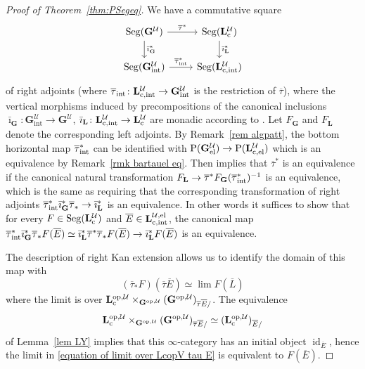 \documentclass{amsart}
\numberwithin{theorem}{subsection}
\theoremstyle{definition}
\providecommand{\op}{\mathrm{op}}
\providecommand{\xel}{\mathrm{el}}
\providecommand{\xint}{\mathrm{int}}
\newcommand{\xU}{\mathcal{U}}
\newcommand{\id}{\operatorname{id}}
\newcommand{\Pre}{\name{P}}
\newcommand{\name}[1]{\ensuremath{\text{\textup{#1}}}}
\newcommand{\levelg}{\mathbf{L}}
\newcommand{\levelgconn}{\levelg_{\name{c}}}
\newcommand{\levelcUint}{\levelg_{\name{c},\name{int}}^{\xU}}
\newcommand{\levelcUel}{\levelg_{\name{c},\name{el}}^{\xU}}
\newcommand{\levelcU}{\levelgconn^{\xU}}
\newcommand{\oplevelcU}{\levelg^{\op,\xU}_{\name{c}}}
\newcommand{\bbY}{\mathbf{G}}
\newcommand{\bbYU}{\bbY^\xU}
\newcommand{\bbYUint}{\bbY_{\xint}^{\xU}}
\newcommand{\bbYUel}{\bbY_{\xel}^{\xU}}
\newcommand{\opbbYU}{\bbY^{\op,\xU}}
\newcommand{\bartau}{\overline{\tau}}
\newcommand{\bartauint}{\bartau_{\name{int}}}
\newcommand{\Seg}{\name{Seg}}
\begin{document}
\begin{proof}[Proof of Theorem~\ref{thm:PSegeq}]
We have a commutative square 
\[
\begin{tikzcd}
\Seg(\bbYU) \arrow{d}{\bar \imath^*_{\bbY}} \arrow{r}{\bartau^*} & \Seg(\levelcU) \arrow{d}{\bar\imath_{\levelg}^*} \\
\Seg(\bbYUint) \arrow{r}{\bartauint^*}  & \Seg(\levelcUint) 
\end{tikzcd}
\]
of right adjoints (where $\bartauint \colon  \levelcUint \to \bbYUint$ is the restriction of $\bartau$), where the vertical morphisms induced by precompositions of the canonical inclusions $\bar\imath_{\bbY}\colon \bbYUint \to \bbYU$, $\bar\imath_{\levelg}\colon \levelcUint \to \levelcU$ are monadic according to \cite[Corollary 8.2]{patterns1}. 
Let $F_{\bbY}$ and $F_\levelg$ denote the corresponding left adjoints. By Remark~\ref{rem algpatt}, the bottom horizontal map $\bartauint^*$ can be identified with $\Pre(\bbYUel)\to \Pre(\levelcUel)$ which is an equivalence by Remark~\ref{rmk bartauel eq}. Then \cite[Corollary 4.7.3.16]{ha} implies that $\bartau^{*}$ is an
equivalence if the canonical natural
transformation $F_{\levelg} \to
\bartau^{*} F_{\bbY} (\bartauint^{*})^{-1}$ is an equivalence, which is the same as requiring that the corresponding
transformation of right adjoints $\bartauint^{*} \bar\imath_{\bbY}^{*}\bartau_{*} \to \bar\imath_{\levelg}^{*}$ is an equivalence. In other words it suffices to show that for every $F \in \Seg(\levelcU)$ and $\overline E\in \levelg_{\name{c}, \xint}^{\xU, \xel}$, the canonical map $\bartauint^{*}\bar\imath_{\bbY}^{*}\bartau_{*}F(\overline E) \simeq
\bar\imath_{\levelg}^{*}\bartau^{*}\bartau_{*}F(\overline E) \to \bar\imath_{\levelg}^{*}F(\overline E)$ is an
equivalence.

The description of right Kan extension allows us to identify the domain of this map with
\begin{equation}\label{equation of limit over LcopV tau E}
(\bartau_{*}F)(\bartau \overline E) \simeq \lim F(\overline L)
\end{equation}
where the limit is over $\oplevelcU\times_{\opbbYU}(\opbbYU)_{\bartau \overline E/}$.
The equivalence \[ \oplevelcU\times_{\opbbYU}(\opbbYU)_{\bartau \overline E/} \simeq (\levelgconn^{\op, \xU})_{\overline E/}\] of Lemma~\ref{lem LY} implies that this $\infty$-category has an initial object $\id_{\overline E}$, hence the limit in \eqref{equation of limit over LcopV tau E} is equivalent to $F(\overline E)$.
\end{proof}
\end{document}
